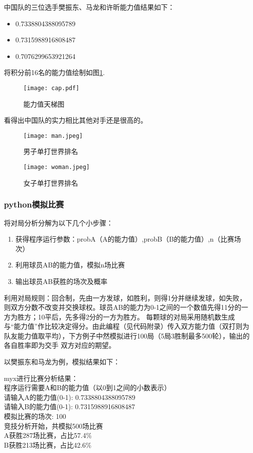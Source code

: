 \documentclass[a4paper,AutoFakeBold,AutoFakeSlant]{ctexart}
\begin{document}
中国队的三位选手樊振东、马龙和许昕能力值结果如下：
\begin{itemize}
  \item 0.7338804388095789
  \item 0.7315988916808487
  \item 0.7076299653921264
\end{itemize}

将积分前16名的能力值绘制如图\ref{f5}.
\begin{figure}[htbp]
  \centering
  \texttt{[image: cap.pdf]}
  \caption{能力值天梯图}
  \label{f5}
\end{figure}

看得出中国队的实力相比其他对手还是很高的。

\begin{figure}[htbp]
  \centering
  \begin{minipage}[t]{0.48\textwidth}
  \centering
  \texttt{[image: man.jpeg]}
  \caption{男子单打世界排名}
  \label{f1}
  \end{minipage}
  \begin{minipage}[t]{0.48\textwidth}
  \centering
  \texttt{[image: woman.jpeg]}
  \caption{女子单打世界排名}
  \label{f2}
  \end{minipage}
\end{figure}

\newpage
\subsubsection{python模拟比赛}
将对局分析分解为以下几个小步骤：
\begin{enumerate}
  \item 获得程序运行参数：probA（A的能力值）,probB（B的能力值）,n（比赛场次）
  \item 利用球员AB的能力值，模拟n场比赛
  \item 输出球员AB获胜的场次及概率
\end{enumerate}

利用对局规则：回合制，先由一方发球，如胜利，则得1分并继续发球，如失败，则双方分数不改变并交换球权。球员AB的能力为0-1之间的一个数值先得11分的一方为胜方；10平后，先多得2分的一方为胜方。
每颗球的对局采用随机数生成与“能力值”作比较决定得分。由此编程（见代码附录）传入双方能力值（双打则为队友能力值取平均），下方例子中然模拟进行100局（5局3胜制最多500轮），输出的各自胜率即为交手
双方对应的期望。

以樊振东和马龙为例，模拟结果如下：
\begin{framed}
  myx进行比赛分析结果：\\
  程序运行需要A和B的能力值（以0到1之间的小数表示）\\
  请输入A的能力值(0-1): 0.7338804388095789\\
  请输入B的能力值(0-1): 0.7315988916808487\\
  模拟比赛的场次: 100\\
  竞技分析开始，共模拟500场比赛\\
  A获胜287场比赛，占比57.4\%\\
  B获胜213场比赛，占比42.6\%  
\end{framed}
\end{document}

